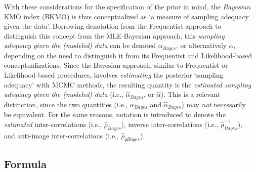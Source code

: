 \documentclass[
  10pt,
  a4paper,
  twoside]{article}
\begin{document}
With these considerations for the specification of the prior in mind, the \emph{Bayesian} KMO index (BKMO) is thus conceptualized as `a measure of sampling adequacy given the data'. Borrowing denotation from the Frequentist approach to distinguish this concept from the MLE-Bayesian approach, this \emph{sampling adequacy given the (modeled) data} can be denoted \(\alpha_{Bayes}\), or alternatively \(\alpha\), depending on the need to distinguish it from its Frequentist and Likelihood-based conceptualizations. Since the Bayesian approach, similar to Frequentist or Likelihood-based procedures, involves \emph{estimating} the posterior `sampling adequacy' with MCMC methods, the resulting quantity is the \emph{estimated sampling adequacy given the (modeled) data} (i.e., \(\hat{\alpha}_{Bayes}\), or \(\hat{\alpha}\)). This is a relevant distinction, since the two quantities (i.e., \(\alpha_{Bayes}\) and \(\hat{\alpha}_{Bayes}\)) may \emph{not} necessarily be equivalent. For the same reasons, notation is introduced to denote the \emph{estimated} inter-correlations (i.e., \(\hat{\rho}_{Bayes}\)), inverse inter-correlations (i.e., \(\hat{\rho}_{Bayes}^{-1}\)), and anti-image inter-correlations (i.e., \(\hat{\rho}_{qBayes}\)).

\subsection{Formula}\label{sec:sec_bkmo_formula}
\end{document}
